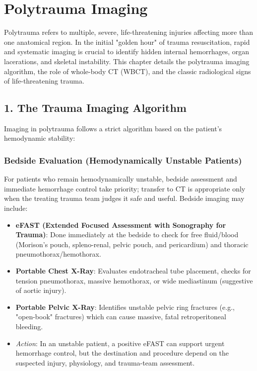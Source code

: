 \chapter{Polytrauma Imaging}

\label{ch:polytrauma}

Polytrauma refers to multiple, severe, life-threatening injuries affecting more than one anatomical region. In the initial "golden hour" of trauma resuscitation, rapid and systematic imaging is crucial to identify hidden internal hemorrhages, organ lacerations, and skeletal instability. This chapter details the polytrauma imaging algorithm, the role of whole-body CT (WBCT), and the classic radiological signs of life-threatening trauma.


\section*{1. The Trauma Imaging Algorithm}
Imaging in polytrauma follows a strict algorithm based on the patient's hemodynamic stability:

\subsection*{Bedside Evaluation (Hemodynamically Unstable Patients)}
For patients who remain hemodynamically unstable, bedside assessment and immediate hemorrhage control take priority; transfer to CT is appropriate only when the treating trauma team judges it safe and useful. Bedside imaging may include:
\begin{itemize}
    \item \textbf{eFAST (Extended Focused Assessment with Sonography for Trauma)}: Done immediately at the bedside to check for free fluid/blood (Morison's pouch, spleno-renal, pelvic pouch, and pericardium) and thoracic pneumothorax/hemothorax.
    \item \textbf{Portable Chest X-Ray}: Evaluates endotracheal tube placement, checks for tension pneumothorax, massive hemothorax, or wide mediastinum (suggestive of aortic injury).
    \item \textbf{Portable Pelvic X-Ray}: Identifies unstable pelvic ring fractures (e.g., "open-book" fractures) which can cause massive, fatal retroperitoneal bleeding.
    \item \textit{Action}: In an unstable patient, a positive eFAST can support urgent hemorrhage control, but the destination and procedure depend on the suspected injury, physiology, and trauma-team assessment.
\end{itemize}

